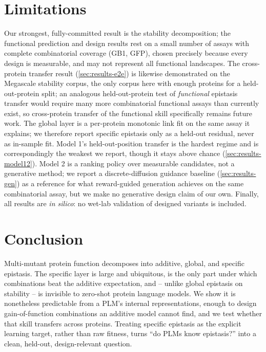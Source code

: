 \documentclass{article}
\begin{document}
\section{Limitations}
\label{sec:limitations}

Our strongest, fully-committed result is the stability decomposition; the
functional prediction and design results rest on a small number of assays with
complete combinatorial coverage (GB1, GFP), chosen precisely because every design
is measurable, and may not represent all functional landscapes. The cross-protein
transfer result (\cref{sec:results-e2e}) is likewise demonstrated on the Megascale
stability corpus, the only corpus here with enough proteins for a held-out-protein
split; an analogous held-out-protein test of \emph{functional} epistasis transfer
would require many more combinatorial functional assays than currently exist, so
cross-protein transfer of the functional skill specifically remains future work.
The global layer is a per-protein monotonic link fit on the same assay it
explains; we therefore report specific epistasis only as a held-out residual,
never as in-sample fit.
Model 1's held-out-position transfer is the hardest regime and is correspondingly
the weakest we report, though it stays above chance (\cref{sec:results-model12}).
Model 2 is a ranking policy over measurable candidates, not a generative method;
we report a discrete-diffusion guidance baseline (\cref{sec:results-gen}) as a
reference for what reward-guided generation \citep{wang2025drakes,li2024svdd}
achieves on the same combinatorial assay, but we make no generative design claim of
our own. Finally, all results are
\emph{in silico}: no wet-lab validation of designed variants is included.

\section{Conclusion}
\label{sec:conclusion}

Multi-mutant protein function decomposes into additive, global, and specific
epistasis. The specific layer is large and ubiquitous, is the only part under
which combinations beat the additive expectation, and -- unlike global epistasis
on stability -- is invisible to zero-shot protein language models. We show it is
nonetheless predictable from a PLM's internal representations, enough to design
gain-of-function combinations an additive model cannot find, and we test whether
that skill transfers across proteins. Treating specific epistasis as the explicit
learning target, rather than raw fitness, turns ``do PLMs know epistasis?'' into a
clean, held-out, design-relevant question.
\end{document}
